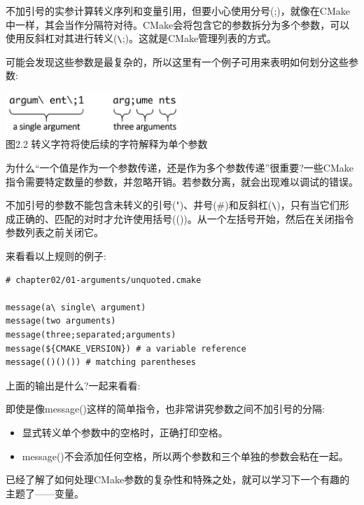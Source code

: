 不加引号的实参计算转义序列和变量引用，但要小心使用分号(;)，就像在CMake中一样，其会当作分隔符对待。CMake会将包含它的参数拆分为多个参数，可以使用反斜杠对其进行转义(\verb|\|;)。这就是CMake管理列表的方式。

可能会发现这些参数是最复杂的，所以这里有一个例子可用来表明如何划分这些参数:

\begin{center}
\includegraphics[width=0.5\textwidth]{content/1/chapter2/images/2.jpg}\\
图2.2 转义字符将使后续的字符解释为单个参数
\end{center}

\begin{tcolorbox}[colback=black!5!white,colframe=black!75!black,title=问题]
为什么“一个值是作为一个参数传递，还是作为多个参数传递”很重要?一些CMake指令需要特定数量的参数，并忽略开销。若参数分离，就会出现难以调试的错误。
\end{tcolorbox}

不加引号的参数不能包含未转义的引号(")、井号(\#)和反斜杠(\verb|\|)，只有当它们形成正确的、匹配的对时才允许使用括号(())。从一个左括号开始，然后在关闭指令参数列表之前关闭它。

来看看以上规则的例子:

\begin{lstlisting}[style=styleCMake]
# chapter02/01-arguments/unquoted.cmake
	
message(a\ single\ argument)
message(two arguments)
message(three;separated;arguments)
message(${CMAKE_VERSION}) # a variable reference
message(()()()) # matching parentheses
\end{lstlisting}

上面的输出是什么?一起来看看:


即使是像message()这样的简单指令，也非常讲究参数之间不加引号的分隔:

\begin{itemize}
\item 
显式转义单个参数中的空格时，正确打印空格。

\item 
message()不会添加任何空格，所以两个参数和三个单独的参数会粘在一起。
\end{itemize}

已经了解了如何处理CMake参数的复杂性和特殊之处，就可以学习下一个有趣的主题了——变量。









